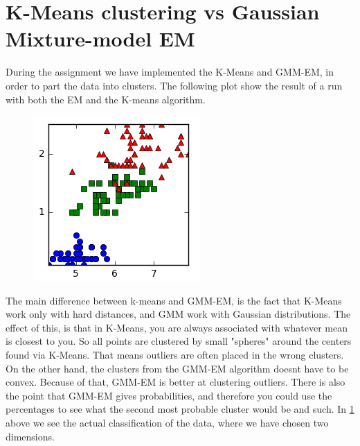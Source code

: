 \documentclass[a4paper,10pt,article,oneside,english]{memoir}
\let\oldcaption\caption
\renewcommand{\caption}[1]{\oldcaption{\emph{#1}}}
\begin{document}
\section*{K-Means clustering vs Gaussian Mixture-model EM}
During the assignment we have implemented the K-Means and GMM-EM, in order to part the data into clusters. The following plot show the result of a run with both the EM and the K-means algorithm.
\begin{figure}
	\centering
	\includegraphics[width=\textwidth]{original.png}
	\caption{}
	\label{fig:orig}
\end{figure}
The main difference between k-means and GMM-EM, is the fact that K-Means work only with hard distances, and GMM work with Gaussian distributions. The effect of this, is that in K-Means, you are always associated with whatever mean is closest to you. So all points are clustered by small "spheres" around the centers found via K-Means. That means outliers are often placed in the wrong clusters. On the other hand, the clusters from the GMM-EM algorithm doesnt have to be convex. Because of that, GMM-EM is better at clustering outliers.
There is also the point that GMM-EM gives probabilities, and therefore you could use the percentages to see what the second most probable cluster would be and such.
In \ref{fig:orig} above we see the actual classification of the data, where we have chosen two dimensions.
\end{document}

